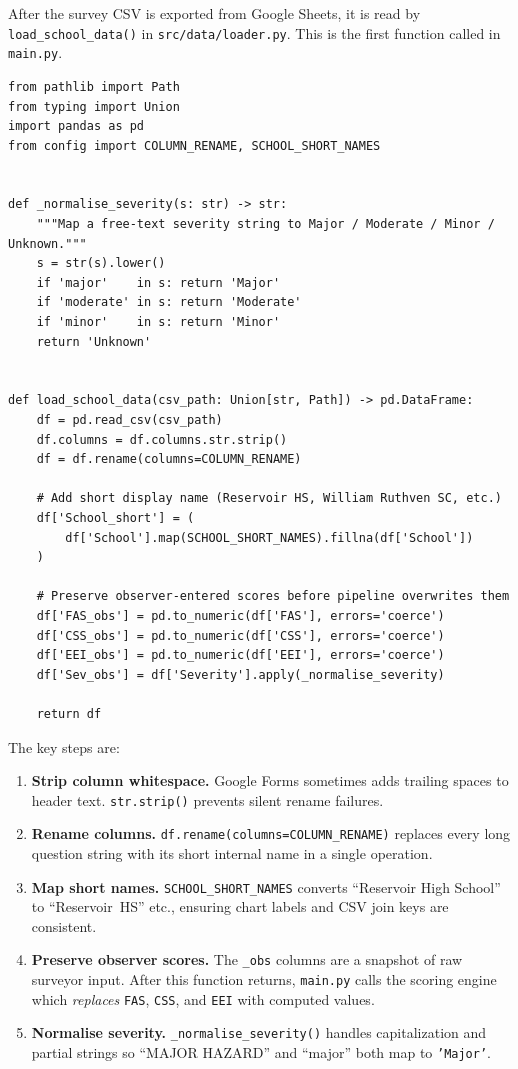 \documentclass[11pt,a4paper,openany]{book}
\begin{document}
After the survey CSV is exported from Google Sheets, it is read by \texttt{load\_school\_data()} in \texttt{src/data/loader.py}. This is the first function called in \texttt{main.py}.

\begin{lstlisting}[style=python, caption={Data loading and cleaning --- src/data/loader.py.}]
from pathlib import Path
from typing import Union
import pandas as pd
from config import COLUMN_RENAME, SCHOOL_SHORT_NAMES


def _normalise_severity(s: str) -> str:
    """Map a free-text severity string to Major / Moderate / Minor / Unknown."""
    s = str(s).lower()
    if 'major'    in s: return 'Major'
    if 'moderate' in s: return 'Moderate'
    if 'minor'    in s: return 'Minor'
    return 'Unknown'


def load_school_data(csv_path: Union[str, Path]) -> pd.DataFrame:
    df = pd.read_csv(csv_path)
    df.columns = df.columns.str.strip()
    df = df.rename(columns=COLUMN_RENAME)

    # Add short display name (Reservoir HS, William Ruthven SC, etc.)
    df['School_short'] = (
        df['School'].map(SCHOOL_SHORT_NAMES).fillna(df['School'])
    )

    # Preserve observer-entered scores before pipeline overwrites them
    df['FAS_obs'] = pd.to_numeric(df['FAS'], errors='coerce')
    df['CSS_obs'] = pd.to_numeric(df['CSS'], errors='coerce')
    df['EEI_obs'] = pd.to_numeric(df['EEI'], errors='coerce')
    df['Sev_obs'] = df['Severity'].apply(_normalise_severity)

    return df
\end{lstlisting}

The key steps are:

\begin{enumerate}
  \item \textbf{Strip column whitespace.} Google Forms sometimes adds trailing spaces to header text. \texttt{str.strip()} prevents silent rename failures.
  \item \textbf{Rename columns.} \texttt{df.rename(columns=COLUMN\_RENAME)} replaces every long question string with its short internal name in a single operation.
  \item \textbf{Map short names.} \texttt{SCHOOL\_SHORT\_NAMES} converts ``Reservoir High School'' to ``Reservoir~HS'' etc., ensuring chart labels and CSV join keys are consistent.
  \item \textbf{Preserve observer scores.} The \texttt{\_obs} columns are a snapshot of raw surveyor input. After this function returns, \texttt{main.py} calls the scoring engine which \emph{replaces} \texttt{FAS}, \texttt{CSS}, and \texttt{EEI} with computed values.
  \item \textbf{Normalise severity.} \texttt{\_normalise\_severity()} handles capitalization and partial strings so ``MAJOR HAZARD'' and ``major'' both map to \texttt{'Major'}.
\end{enumerate}
\end{document}
